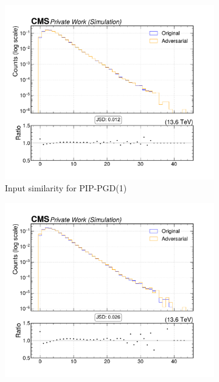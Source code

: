\begin{figure}[htbp]
  \centering
  \begin{subfigure}[t]{0.32\textwidth}
    \includegraphics[width=\linewidth]{media/output/features/compare/combined_it_1/cmp_global_features_n_Npfcand.pdf}
    \caption*{Input similarity for PIP-PGD(1)}
  \end{subfigure}\hfill
  \begin{subfigure}[t]{0.32\textwidth}
    \includegraphics[width=\linewidth]{media/output/features/compare/combined_it_2/cmp_global_features_n_Npfcand.pdf}

\end{subfigure}
\end{figure}
